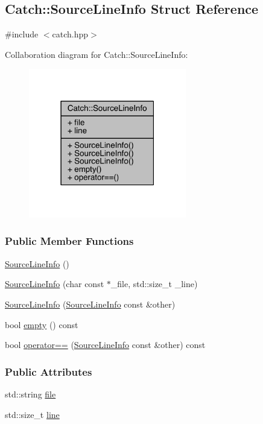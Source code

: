 \hypertarget{a00075}{}\subsection{Catch\+:\+:Source\+Line\+Info Struct Reference}
\label{a00075}


{\ttfamily \#include $<$catch.\+hpp$>$}



Collaboration diagram for Catch\+:\+:Source\+Line\+Info\+:\nopagebreak
\begin{figure}[H]
\begin{center}
\leavevmode
\includegraphics[width=195pt]{a00268}
\end{center}
\end{figure}
\subsubsection*{Public Member Functions}
\begin{DoxyCompactItemize}
\item 
\hyperlink{a00075_a9d44b2e1133794eee0bd5716424c83d6}{Source\+Line\+Info} ()
\item 
\hyperlink{a00075_a6218cb890337d37f708ea94063958940}{Source\+Line\+Info} (char const $\ast$\+\_\+file, std\+::size\+\_\+t \+\_\+line)
\item 
\hyperlink{a00075_a1ec99cc0547ce5909133aaa8f14ed4b1}{Source\+Line\+Info} (\hyperlink{a00075}{Source\+Line\+Info} const \&other)
\item 
bool \hyperlink{a00075_a9a25ffc0640d1a3dd0c9b7e5fcbba7b9}{empty} () const 
\item 
bool \hyperlink{a00075_af0854821b1abfda52796ef0f1294b050}{operator==} (\hyperlink{a00075}{Source\+Line\+Info} const \&other) const 
\end{DoxyCompactItemize}
\subsubsection*{Public Attributes}
\begin{DoxyCompactItemize}
\item 
std\+::string \hyperlink{a00075_adf3ccf0c2bd326eb3466318af82a94dd}{file}
\item 
std\+::size\+\_\+t \hyperlink{a00075_a841e5d696c7b9cde24e45e61dd979c77}{line}
\end{DoxyCompactItemize}


